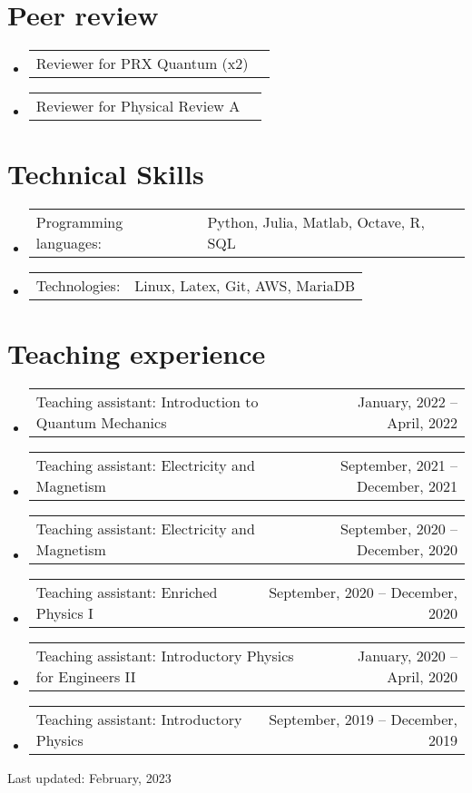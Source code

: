\documentclass[letterpaper,11pt]{article}
\makeatletter
\newcommand{\TeachingItem}[2]{
	\item{\vspace{-1pt}
		\begin{tabular*}{0.92\textwidth}{l@{\extracolsep{\fill}}r}
			{#1} & {#2}
		\end{tabular*}
		\vspace{-5pt}
	}
}
\newcommand{\AwardsItem}[2]{
	\item{\vspace{-1pt}
		\begin{tabular*}{0.97\textwidth}{l@{\extracolsep{\fill}}r}
			{#1} & {#2}
		\end{tabular*}
		\vspace{-5pt}
	}
}
\newcommand{\SkillsItem}[2]{
	\item{\vspace{-1pt}
		\begin{tabular*}{0.97\textwidth}{l l}
			{#1:} & {#2}
		\end{tabular*}
		\vspace{-5pt}
	}
}
\makeatother
\begin{document}
\section*{Peer review}
\begin{itemize}[leftmargin=*]
	\AwardsItem{Reviewer for PRX Quantum (x2)}{}
	\AwardsItem{Reviewer for Physical Review A}{}
\end{itemize}


\section*{Technical Skills}
\begin{itemize}[leftmargin=*]
	\SkillsItem{Programming languages}{Python, Julia, Matlab, Octave, R, SQL}
	\SkillsItem{Technologies}{Linux, Latex, Git, AWS, MariaDB}
\end{itemize}

\section*{Teaching experience}
\begin{itemize}[leftmargin=*]
	\TeachingItem{Teaching assistant: Introduction to Quantum Mechanics}{January, 2022 -- April, 2022}
	\TeachingItem{Teaching assistant: Electricity and Magnetism}{September, 2021 -- December, 2021}
	\TeachingItem{Teaching assistant: Electricity and Magnetism}{September, 2020 -- December, 2020}
	\TeachingItem{Teaching assistant: Enriched Physics I}{September, 2020 -- December, 2020}
	\TeachingItem{Teaching assistant: Introductory Physics for Engineers II}{January, 2020 -- April, 2020}
	\TeachingItem{Teaching assistant: Introductory Physics}{September, 2019 -- December, 2019}
\end{itemize}

\vspace{1cm}

\begin{flushright}
	Last updated: February, 2023
\end{flushright}
\end{document}
